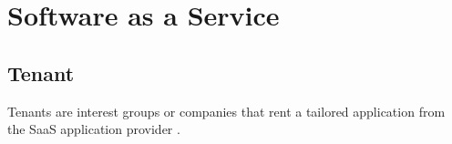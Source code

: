 \section{Software as a Service}
\label{sec:grundlagen:saas}


\subsection{Tenant}
\label{subsec:saas:tenant}
Tenants are interest groups or companies that rent a tailored application from the SaaS application provider \cite{Schroeter2012}.